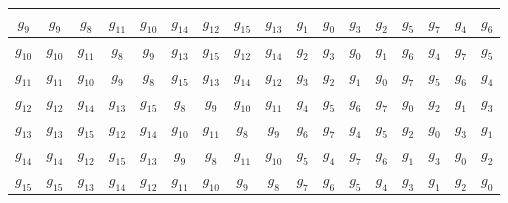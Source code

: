 \documentclass[letterpaper,10pt]{article}
\begin{document}
\begin{enumerate}
\begin{table}[h]
\begin{center}
\begin{tabular}{|c|c|c|c|c|c|c|c|c|c|c|c|c|c|c|c|c|}
    $g_{9}$ & $g_{9}$ & $g_{8}$ & $g_{11}$ & $g_{10}$ & $g_{14}$ & $g_{12}$ &  
    $g_{15}$ & $g_{13}$ & $g_{1}$ & $g_{0}$ & $g_{3}$ & $g_{2}$ & $g_{5}$ & 
    $g_{7}$ & $g_{4}$ & $g_{6}$ \\ \hline
    $g_{10}$ & $g_{10}$ & $g_{11}$ & $g_{8}$ & $g_{9}$ & $g_{13}$ & $g_{15}$ &  
    $g_{12}$ & $g_{14}$ & $g_{2}$ & $g_{3}$ & $g_{0}$ & $g_{1}$ & $g_{6}$ & 
    $g_{4}$ & $g_{7}$ & $g_{5}$ \\ \hline
    $g_{11}$ & $g_{11}$ & $g_{10}$ & $g_{9}$ & $g_{8}$ & $g_{15}$ & $g_{13}$ &  
    $g_{14}$ & $g_{12}$ & $g_{3}$ & $g_{2}$ & $g_{1}$ & $g_{0}$ & $g_{7}$ &
    $g_{5}$ & $g_{6}$ & $g_{4}$ \\ \hline
    $g_{12}$ & $g_{12}$ & $g_{14}$ & $g_{13}$ & $g_{15}$ & $g_{8}$ & $g_{9}$ &  
    $g_{10}$ & $g_{11}$ & $g_{4}$ & $g_{5}$ & $g_{6}$ & $g_{7}$ & $g_{0}$ & 
    $g_{2}$ & $g_{1}$ & $g_{3}$ \\ \hline
    $g_{13}$ & $g_{13}$ & $g_{15}$ & $g_{12}$ & $g_{14}$ & $g_{10}$ & $g_{11}$&
    $g_{8}$ & $g_{9}$ & $g_{6}$ & $g_{7}$ & $g_{4}$ & $g_{5}$ & $g_{2}$ &
    $g_{0}$ & $g_{3}$ & $g_{1}$ \\ \hline
    $g_{14}$ & $g_{14}$ & $g_{12}$ & $g_{15}$ & $g_{13}$ & $g_{9}$ & $g_{8}$ &  
    $g_{11}$ & $g_{10}$ & $g_{5}$ & $g_{4}$ & $g_{7}$ & $g_{6}$ & $g_{1}$ &  
    $g_{3}$ & $g_{0}$ & $g_{2}$ \\ \hline
    $g_{15}$ & $g_{15}$ & $g_{13}$ & $g_{14}$ & $g_{12}$ & $g_{11}$ & $g_{10}$&
    $g_{9}$ & $g_{8}$ & $g_{7}$ & $g_{6}$ & $g_{5}$ & $g_{4}$ & $g_{3}$ & 
    $g_{1}$ & $g_{2}$ & $g_{0}$\\ \hline
    \end{tabular}
    \end{center}
    \end{table}
    

\end{enumerate}
\end{document}
